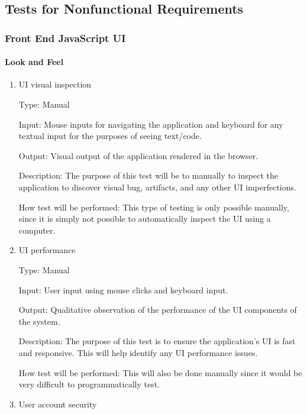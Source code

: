 \documentclass[12pt, titlepage]{article}
\begin{document}
\begin{enumerate}
\begin{enumerate}
\end{enumerate}

\subsection{Tests for Nonfunctional Requirements}

\subsubsection{Front End JavaScript UI}
		
\paragraph{Look and Feel}

\begin{enumerate}

\item{UI visual inspection\\}

Type: Manual

Input: Mouse inputs for navigating the application and keyboard for any textual
input for the purposes of seeing text/code.

Output: Visual output of the application rendered in the browser.

Description: The purpose of this test will be to manually to inspect the application to
discover visual bug, artifacts, and any other UI imperfections.

How test will be performed: This type of testing is only possible manually,
since it is simply not possible to automatically inspect the UI using a
computer.
					
\item{UI performance\\}

Type: Manual

Input: User input using mouse clicks and keyboard input.

Output: Qualitative observation of the performance of the UI components of the
system.

Description: The purpose of this test is to ensure the application's UI
is fast and responsive. This will help identify any UI performance issues.

How test will be performed: This will also be done manually since it would
be very difficult to programmatically test.

\item{User account security\\}


\end{enumerate}
\end{enumerate}
\end{document}
